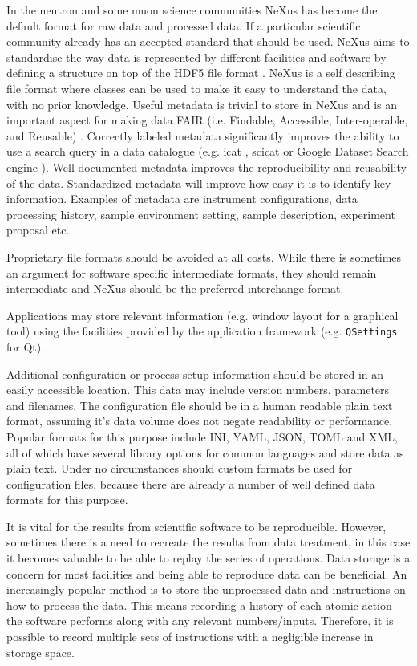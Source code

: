 \documentclass[jnr]{iosart2x}
\begin{document}
In the neutron and some muon science communities NeXus \cite{K_nnecke_2015} has become the default format for raw data and processed data.
If a particular scientific community already has an accepted standard that should be used.
NeXus aims to standardise the way data is represented by different facilities and software by defining a structure on top of the HDF5 file format \cite{HDF5}.
NeXus is a self describing file format where classes can be used to make it easy to understand the data, with no prior knowledge.
Useful metadata is trivial to store in NeXus and is an important aspect for making data FAIR (i.e. Findable, Accessible, Inter-operable, and Reusable) \cite{panosc}.
Correctly labeled metadata significantly improves the ability to use a search query in a data catalogue (e.g. icat \cite{icat}, scicat \cite{scicat} or Google Dataset Search engine \cite{google_dataset_search}).
Well documented metadata improves the reproducibility and reusability of the data.
Standardized metadata will improve how easy it is to identify key information.
Examples of metadata are instrument configurations, data processing history, sample environment setting, sample description, experiment proposal etc.

Proprietary file formats should be avoided at all costs.
While there is sometimes an argument for software specific intermediate formats, they should remain intermediate and NeXus should be the preferred interchange format.

Applications may store relevant information (e.g. window layout for a graphical tool) using the facilities provided by the application framework (e.g. \texttt{QSettings} for Qt).

Additional configuration or process setup information should be stored in an easily accessible location.
This data may include version numbers, parameters and filenames.
The configuration file should be in a human readable plain text format, assuming it's data volume does not negate readability or performance.
Popular formats for this purpose include INI, YAML, JSON, TOML and XML, all of which have several library options for common languages and store data as plain text.
Under no circumstances should custom formats be used for configuration files, because there are already a number of well defined data formats for this purpose.

It is vital for the results from scientific software to be reproducible.
However, sometimes there is a need to recreate the results from data treatment, in this case it becomes valuable to be able to replay the series of operations.
Data storage is a concern for most facilities and being able to reproduce data can be beneficial.
An increasingly popular method is to store the unprocessed data and instructions on how to process the data.
This means recording a history of each atomic action the software performs along with any relevant numbers/inputs.
Therefore, it is possible to record multiple sets of instructions with a negligible increase in storage space.
\end{document}
